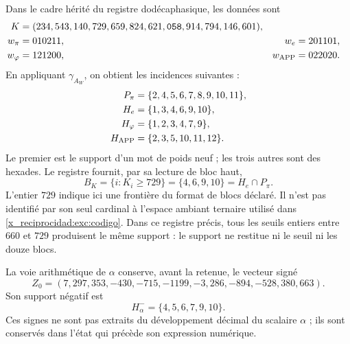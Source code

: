 Dans le cadre hérité du registre dodécaphasique, les données sont
\begin{align}
 K={}&(234,543,140,729,659,824,621,\mathtt{058},914,794,146,601),
 \label{x_reciprocidad:exc:k}\\
 w_\pi={}&010211, &w_e={}&201101,\nonumber\\
 w_\varphi={}&121200, &w_{\rm APP}={}&022020.\nonumber
\end{align}
En appliquant $\gamma_{A_W}$, on obtient les incidences suivantes :
\begin{align*}
 P_\pi&=\{2,4,5,6,7,8,9,10,11\},\\
 H_e&=\{1,3,4,6,9,10\},\\
 H_\varphi&=\{1,2,3,4,7,9\},\\
 H_{\rm APP}&=\{2,3,5,10,11,12\}.
\end{align*}
Le premier est le support d'un mot de poids neuf ; les trois autres
sont des hexades. Le registre fournit, par sa lecture de bloc haut,
\begin{equation}
 B_K=\{i:K_i\geq729\}=\{4,6,9,10\}=H_e\cap P_\pi.
 \label{x_reciprocidad:exc:bk}
\end{equation}
L'entier $729$ indique ici une frontière du format de blocs
déclaré. Il n'est pas identifié par son seul cardinal à l'espace ambiant
ternaire utilisé dans \eqref{x_reciprocidad:exc:codigo}. Dans ce registre précis, tous
les seuils entiers entre $660$ et $729$ produisent le même support :
le support ne restitue ni le seuil ni les douze blocs.

La voie arithmétique de $\alpha$ conserve, avant la retenue, le vecteur
signé
\begin{equation}
 Z_0=(7,297,353,-430,-715,-1199,-3,286,-894,-528,380,663).
 \label{x_reciprocidad:exc:precarry}
\end{equation}
Son support négatif est
\begin{equation}
 H^-_\alpha=\{4,5,6,7,9,10\}.
 \label{x_reciprocidad:exc:halpha}
\end{equation}
Ces signes ne sont pas extraits du développement décimal du scalaire
$\alpha$ ; ils sont conservés dans l'état qui précède son expression numérique.


